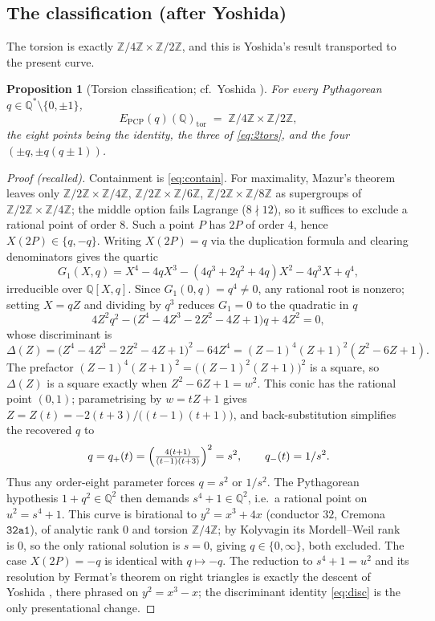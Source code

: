 \documentclass[11pt,reqno]{amsart}
\theoremstyle{plain}
\newtheorem{proposition}{Proposition}
\theoremstyle{definition}
\newcommand{\Q}{\mathbb{Q}}
\newcommand{\Z}{\mathbb{Z}}
\newcommand{\Epcp}{E_{\mathrm{PCP}}}
\begin{document}
\subsection{The classification (after Yoshida)}
The torsion is exactly $\Z/4\Z\times\Z/2\Z$, and this is Yoshida's result transported
to the present curve.

\begin{proposition}[Torsion classification; cf.\ Yoshida {\cite[Lemma 2.1]{Yoshida}}]
\label{prop:tors}
For every Pythagorean $q\in\Q^{\ast}\setminus\{0,\pm1\}$,
\[
\Epcp(q)(\Q)_{\mathrm{tor}}\;=\;\Z/4\Z\times\Z/2\Z,
\]
the eight points being the identity, the three of \eqref{eq:2tors}, and the four
$(\pm q,\pm q(q\pm1))$.
\end{proposition}

\begin{proof}[Proof (recalled)]
Containment is \eqref{eq:contain}. For maximality, Mazur's theorem \cite{Mazur} leaves
only $\Z/2\Z\times\Z/4\Z$, $\Z/2\Z\times\Z/6\Z$, $\Z/2\Z\times\Z/8\Z$ as supergroups of
$\Z/2\Z\times\Z/4\Z$; the middle option fails Lagrange ($8\nmid12$), so it suffices to
exclude a rational point of order $8$. Such a point $P$ has $2P$ of order $4$, hence
$X(2P)\in\{q,-q\}$. Writing $X(2P)=q$ via the duplication formula and clearing
denominators gives the quartic
\[
G_{1}(X,q)=X^{4}-4qX^{3}-(4q^{3}+2q^{2}+4q)X^{2}-4q^{3}X+q^{4},
\]
irreducible over $\Q[X,q]$. Since $G_{1}(0,q)=q^{4}\neq0$, any rational root is
nonzero; setting $X=qZ$ and dividing by $q^{3}$ reduces $G_{1}=0$ to the quadratic in $q$
\[
4Z^{2}q^{2}-\bigl(Z^{4}-4Z^{3}-2Z^{2}-4Z+1\bigr)q+4Z^{2}=0,
\]
whose discriminant is
\begin{equation}\label{eq:disc}
\Delta(Z)=\bigl(Z^{4}-4Z^{3}-2Z^{2}-4Z+1\bigr)^{2}-64Z^{4}
=(Z-1)^{4}(Z+1)^{2}(Z^{2}-6Z+1).
\end{equation}
The prefactor $(Z-1)^{4}(Z+1)^{2}=\bigl((Z-1)^{2}(Z+1)\bigr)^{2}$ is a square, so
$\Delta(Z)$ is a square exactly when $Z^{2}-6Z+1=w^{2}$. This conic has the rational
point $(0,1)$; parametrising by $w=tZ+1$ gives $Z=Z(t)=-2(t+3)/\bigl((t-1)(t+1)\bigr)$,
and back-substitution simplifies the recovered $q$ to
\[
q=q_{+}(t)=\Bigl(\tfrac{4(t+1)}{(t-1)(t+3)}\Bigr)^{2}=s^{2},
\qquad q_{-}(t)=1/s^{2}.
\]
Thus any order-eight parameter forces $q=s^{2}$ or $1/s^{2}$. The Pythagorean hypothesis
$1+q^{2}\in\Q^{2}$ then demands $s^{4}+1\in\Q^{2}$, i.e.\ a rational point on
$u^{2}=s^{4}+1$. This curve is birational to $y^{2}=x^{3}+4x$ (conductor $32$, Cremona
$\mathtt{32a1}$), of analytic rank $0$ and torsion $\Z/4\Z$; by Kolyvagin its
Mordell--Weil rank is $0$, so the only rational solution is $s=0$, giving
$q\in\{0,\infty\}$, both excluded. The case $X(2P)=-q$ is identical with $q\mapsto-q$.
The reduction to $s^{4}+1=u^{2}$ and its resolution by Fermat's theorem on right
triangles is exactly the descent of Yoshida \cite[Lemma 2.1]{Yoshida}, there phrased on
$y^{2}=x^{3}-x$; the discriminant identity \eqref{eq:disc} is the only presentational
change.
\end{proof}
\end{document}
